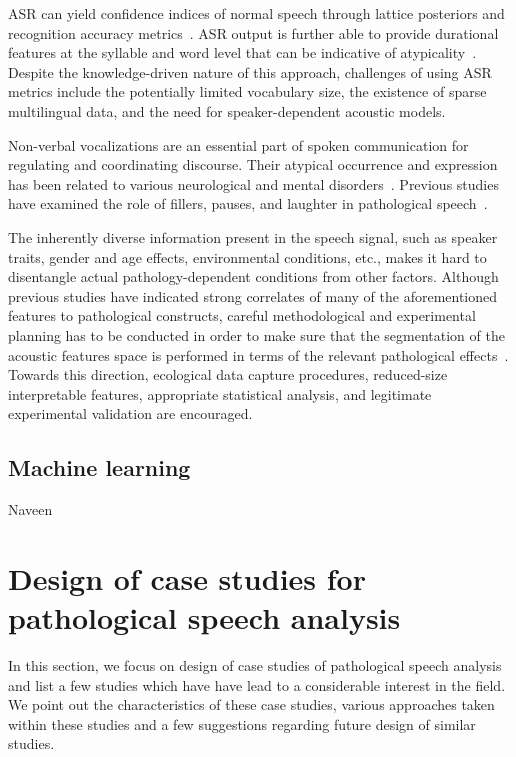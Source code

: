 \documentclass{article}
\begin{document}
ASR can yield confidence indices of normal speech through lattice posteriors and recognition accuracy metrics~\cite{kim2015automatic,zlotnik2015random,maier2009peaks,sharma2009universal,middag2009automated}. ASR output is further able to provide durational features at the syllable and word level that can be indicative of atypicality~\cite{an2015automatic,duez2006consonant}. Despite the knowledge-driven nature of this approach, challenges of using ASR metrics include the potentially limited vocabulary size, the existence of sparse multilingual data, and the need for speaker-dependent acoustic models.

Non-verbal vocalizations are an essential part of spoken communication for regulating and coordinating discourse. Their atypical occurrence and expression has been related to various neurological and mental disorders~\cite{lake2011listener}. Previous studies have examined the role of fillers, pauses, and laughter in pathological speech~\cite{heeman2010autism,lake2011listener,gupta2014predicting}.

The inherently diverse information present in the speech signal, such as speaker traits, gender and age effects, environmental conditions, etc., makes it hard to disentangle actual pathology-dependent conditions from other factors. Although previous studies have indicated strong correlates of many of the aforementioned features to pathological constructs, careful methodological and experimental planning has to be conducted in order to make sure that the segmentation of the acoustic features space is performed in terms of the relevant pathological effects~\cite{bone2013classifying}. Towards this direction, ecological data capture procedures, reduced-size interpretable features, appropriate statistical analysis, and legitimate experimental validation are encouraged.

\subsection{Machine learning}
Naveen

\section{Design of case studies for pathological speech analysis}
In this section, we focus on design of case studies of pathological speech analysis and list a few studies which have have lead to a considerable interest in the field. 
We point out the characteristics of these case studies, various approaches taken within these studies and a few suggestions regarding future design of similar studies. 
\end{document}
